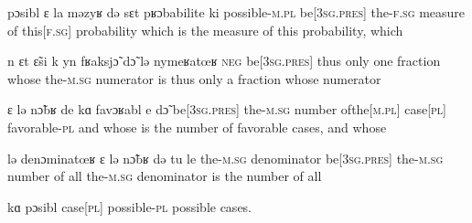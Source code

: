               {{pɔsibl{\liaison}} ɛ la məzyʁ də sɛt pʁɔbabilite ki}
              {possible-\textsc{m}.\textsc{pl} {be[3\textsc{sg}.\textsc{pres}]} the-\textsc{f}.\textsc{sg} measure of {this[\textsc{f}.\textsc{sg}]} probability which}
              {is the measure of this probability, which}

              {n {ɛt{\liaison}} \~{ɛ}si {k{\liaison}} yn fʁaksj\~{ɔ} d\~{ɔ} lə {nymeʁatœʁ\liaison}}
              {\textsc{neg} {be[3\textsc{sg}.\textsc{pres}]} thus only one fraction whose the-\textsc{m}.\textsc{sg} numerator}
              {is thus only  a fraction whose  numerator}

              {ɛ lə n\~{ɔ}bʁ de kɑ favɔʁabl e d\~{ɔ}}
              {{be[3\textsc{sg}.\textsc{pres}]} the-\textsc{m}.\textsc{sg} number {of{\textunderscore}the[\textsc{m}.\textsc{pl}]} {case[\textsc{pl}]} favorable-\textsc{pl} and whose}
              {is the number of favorable cases, and whose}

              {lə {denɔminatœʁ\liaison} ɛ lə n\~{ɔ}bʁ də tu le}
              {the-\textsc{m}.\textsc{sg} denominator {be[3\textsc{sg}.\textsc{pres}]} the-\textsc{m}.\textsc{sg} number of all the-\textsc{m}.\textsc{sg}}
              {denominator is the number of all}

              {kɑ pɔsibl}
              {case[\textsc{pl}] possible-\textsc{pl}}
              {possible cases.}
